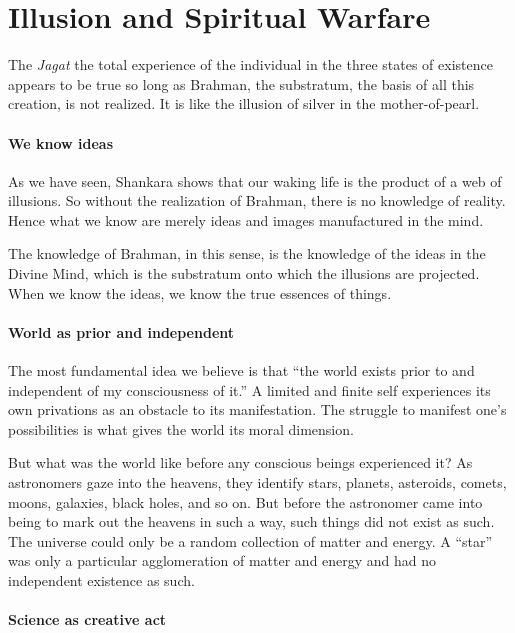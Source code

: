 \section{Illusion and Spiritual Warfare}

\begin{quotex}
The \emph{Jagat} the total experience of the individual in the three states of existence appears to be true so long as Brahman, the substratum, the basis of all this creation, is not realized. It is like the illusion of silver in the mother-of-pearl.
\end{quotex}


\paragraph{We know ideas}

As we have seen, Shankara shows that our waking life is the product of a web of illusions. So without the realization of Brahman, there is no knowledge of reality. Hence what we know are merely ideas and images manufactured in the mind.

The knowledge of Brahman, in this sense, is the knowledge of the ideas in the Divine Mind, which is the substratum onto which the illusions are projected. When we know the ideas, we know the true essences of things.

\paragraph{World as prior and independent}


The most fundamental idea we believe is that ``the world exists prior to and independent of my consciousness of it.'' A limited and finite self experiences its own privations as an obstacle to its manifestation. The struggle to manifest one's possibilities is what gives the world its moral dimension.

But what was the world like before any conscious beings experienced it? As astronomers gaze into the heavens, they identify stars, planets, asteroids, comets, moons, galaxies, black holes, and so on. But before the astronomer came into being to mark out the heavens in such a way, such things did not exist as such. The universe could only be a random collection of matter and energy. A ``star'' was only a particular agglomeration of matter and energy and had no independent existence as such.

\paragraph{Science as creative act}


